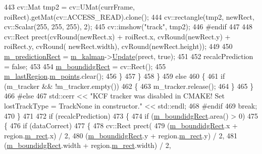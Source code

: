 \begin{DoxyCode}
443                     cv::Mat tmp2 = cv::UMat(currFrame, roiRect).getMat(cv::ACCESS\_READ).clone();
444                     cv::rectangle(tmp2, newRect, cv::Scalar(255, 255, 255), 2);
445                     cv::imshow(\textcolor{stringliteral}{"track"}, tmp2);
446 \textcolor{preprocessor}{#endif}
447 
448                     cv::Rect prect(cvRound(newRect.x) + roiRect.x, cvRound(newRect.y) + roiRect.y, cvRound(
      newRect.width), cvRound(newRect.height));
449 
450                     \mbox{\hyperlink{class_c_track_aeab9c3c95a6d988918f5874a8910b90b}{m\_predictionRect}} = \mbox{\hyperlink{class_c_track_a8d676e67fb1b5cae95cc7db3cdc24f5f}{m\_kalman}}->\mbox{\hyperlink{class_t_kalman_filter_a0c25b9a1a9676956aed0db44ad56696a}{Update}}(prect, \textcolor{keyword}{true});
451 
452                     recalcPrediction = \textcolor{keyword}{false};
453 
454                     \mbox{\hyperlink{class_c_track_a1d15e2cbc31754f60f6bbe30f218d0a4}{m\_boundidgRect}} = cv::Rect();
455                     \mbox{\hyperlink{class_c_track_a5af91fbfad7ebf07bd0f681f915e440c}{m\_lastRegion}}.\mbox{\hyperlink{class_c_region_a65be08ae81a8d174d95ae35a2f7fb212}{m\_points}}.clear();
456                 \}
457             \}
458         \}
459         \textcolor{keywordflow}{else}
460         \{
461             \textcolor{keywordflow}{if} (m\_tracker && !m\_tracker.empty())
462             \{
463                 m\_tracker.release();
464             \}
465         \}
466 \textcolor{preprocessor}{#else}
467         std::cerr << \textcolor{stringliteral}{"KCF tracker was disabled in CMAKE! Set lostTrackType = TrackNone in constructor."} << 
      std::endl;
468 \textcolor{preprocessor}{#endif}
469         \textcolor{keywordflow}{break};
470     \}
471 
472     \textcolor{keywordflow}{if} (recalcPrediction)
473     \{
474         \textcolor{keywordflow}{if} (\mbox{\hyperlink{class_c_track_a1d15e2cbc31754f60f6bbe30f218d0a4}{m\_boundidgRect}}.area() > 0)
475         \{
476             \textcolor{keywordflow}{if} (dataCorrect)
477             \{
478                 cv::Rect prect(
479                             (\mbox{\hyperlink{class_c_track_a1d15e2cbc31754f60f6bbe30f218d0a4}{m\_boundidgRect}}.x + region.\mbox{\hyperlink{class_c_region_a6f68304e90428db829cc38792fa3e1e8}{m\_rect}}.x) / 2,
480                             (\mbox{\hyperlink{class_c_track_a1d15e2cbc31754f60f6bbe30f218d0a4}{m\_boundidgRect}}.y + region.\mbox{\hyperlink{class_c_region_a6f68304e90428db829cc38792fa3e1e8}{m\_rect}}.y) / 2,
481                             (\mbox{\hyperlink{class_c_track_a1d15e2cbc31754f60f6bbe30f218d0a4}{m\_boundidgRect}}.width + region.\mbox{\hyperlink{class_c_region_a6f68304e90428db829cc38792fa3e1e8}{m\_rect}}.width) / 2,

\end{DoxyCode}
